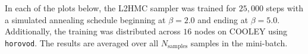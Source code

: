 \documentclass[../main.tex]{subfiles}
\begin{document}
%
%
%
In each of the plots below, the L2HMC sampler was trained for $25,000$ steps with a simulated annealing schedule
beginning at $\beta = 2.0$ and ending at $\beta = 5.0$.
%
Additionally, the training was distributed across $16$ nodes on COOLEY using \texttt{horovod}.
%
The results are averaged over all $N_{\mathrm{samples}}$ samples in the
mini-batch.
\end{document}
